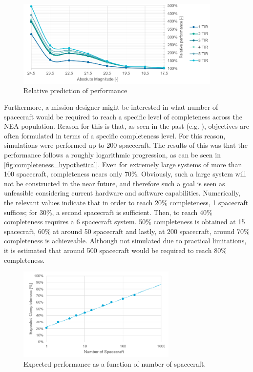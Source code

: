 \begin{figure}[htbp]
 \centering
 \includegraphics[width=0.9\textwidth]{img/performance_prediction_rel.png}
 \caption{Relative prediction of performance}
 \label{fig:performance_prediction_rel}
\end{figure}

Furthermore, a mission designer might be interested in what number of spacecraft would be required to reach a specific level of completeness across the NEA population. Reason for this is that, as seen in the past (e.g. \cite{2003NEOSDT}), objectives are often formulated in terms of a specific completeness level. For this reason, simulations were performed up to 200 spacecraft. The results of this was that the performance follows a roughly logarithmic progression, as can be seen in \autoref{fig:completeness_hypothetical}. Even for extremely large systems of more than 100 spacecraft, completeness nears only 70\%. Obviously, such a large system will not be constructed in the near future, and therefore such a goal is seen as unfeasible considering current hardware and software capabilities. Numerically, the relevant values indicate that in order to reach 20\% completeness, 1 spacecraft suffices; for 30\%, a second spacecraft is sufficient. Then, to reach 40\% completeness requires a 6 spacecraft system. 50\% completeness is obtained at 15 spacecraft, 60\% at around 50 spacecraft and lastly, at 200 spacecraft, around 70\% completeness is achieveable. Although not simulated due to practical limitations, it is estimated that around 500 spacecraft would be required to reach 80\% completeness.

\begin{figure}[htbp]
 \centering
 \includegraphics[width=0.7\textwidth]{img/completeness_hypothetical.png}
 \caption{Expected performance as a function of number of spacecraft.}
 \label{fig:completeness_hypothetical}
\end{figure}

